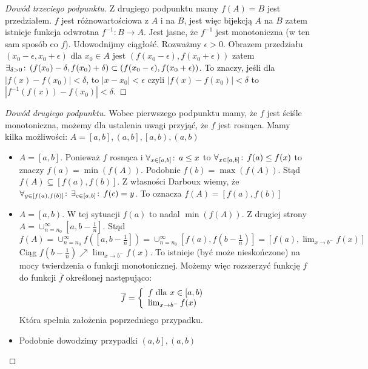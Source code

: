 \documentclass[9pt]{article}
\begin{document}
\begin{proof}[Dowód trzeciego podpunktu]
    Z drugiego podpunktu mamy $f(A) = B$ jest przedziałem. $f$ jest różnowartościowa z $A$ i na $B$,
    jest więc bijekcją $A$ na $B$ zatem istnieje funkcja odwrotna $f^{-1}: B \to A$.
    Jest jasne, że $f^{-1}$ jest monotoniczna (w ten sam sposób co $f$). Udowodnijmy ciągłość.
    Rozważmy $\epsilon > 0$. Obrazem przedziału $(x_0 - \epsilon, x_0 + \epsilon)$ dla $x_0 \in A$
    jest $\left(f(x_0 - \epsilon), f(x_0 + \epsilon)\right)$
    zatem
    $
    \exists_{\delta > 0} \! : \,
    \left(f(x_0) - \delta, f(x_0) + \delta\right)
    \subset
    \left(f(x_0 - \epsilon), f(x_0 + \epsilon)\right)
    $.
    To znaczy, jeśli dla $\left|f(x) -f(x_0)\right| < \delta$, to
    $\left|x - x_0\right| < \epsilon$
    czyli
    $\left|f(x) - f(x_0)\right| < \delta$
    to
    $\left|f^{-1}(f(x)) - f(x_0)\right|  < \delta$.
\end{proof}

\begin{proof}[Dowód drugiego podpunktu]
    Wobec pierwszego podpunktu mamy, że $f$ jest ściśle monotoniczna, możemy dla ustalenia uwagi
    przyjąć, że $f$ jest rosnąca. Mamy kilka możliwości:
    $A = \left[a,b\right], \left(a, b\right], \left[a, b\right), \left(a, b\right)$
    \begin{itemize}
        \item $A = \left[a,b\right]$. Ponieważ $f$ rosnąca i $\forall_{x \in \left[a,b\right]} \! : \, a \le x$
            to $\forall_{x \in \left[a, b\right]} \! : \, f(a) \le f(x)$ to znaczy $f(a) = \min(f(A))$. Podobnie
            $f(b) = \max(f(A))$. Stąd $f(A) \subseteq \left[f(a), f(b)\right]$. Z własności Darboux
            wiemy, że $\forall_{y \in \left[f(a), f(b)\right]} \! : \, \exists_{c \in \left[a, b\right]} \! : \, f(c) = y$. To
            oznacza $f(A) = \left[f(a), f(b)\right]$
        \item $A = \left[a, b\right)$. W tej sytuacji $f(a)$ to nadal $\min \left(f(A)\right)$. Z
            drugiej strony $A = \cup_{n = n_0}^\infty \left[a,b - \frac{1}{n}\right]$. Stąd
            $f(A) =
            \cup_{n = n_0}^\infty f\left(\left[a, b- \frac{1}{n}\right]\right) =
            \cup_{n = n_0}^\infty \left[f\left(a\right), f\left(b- \frac{1}{n}\right)\right] =
            \left[f(a), \lim_{x \to b^-} f(x)\right]
            $
            Ciąg $f(b- \frac{1}{n}) \nearrow \lim_{x \to b^-} f(x)$. To istnieje (być może
            nieskończone) na mocy twierdzenia o funkcji monotonicznej. Możemy więc rozszerzyć
            funkcję $f$ do funkcji $\overline{f}$ określonej następująco:
            \[
                \overline{f} =
                \left\{
                    \begin{array}{l}
                        f \text{ dla } x \in \left[a, b\right) \\
                        \lim_{x \to b^-} f(x)
                    \end{array}
                \right.
            \]
            Która spełnia założenia poprzedniego przypadku.
        \item Podobnie dowodzimy przypadki $\left(a,b\right], \left(a, b \right)$
    \end{itemize}
\end{proof}
\end{document}
